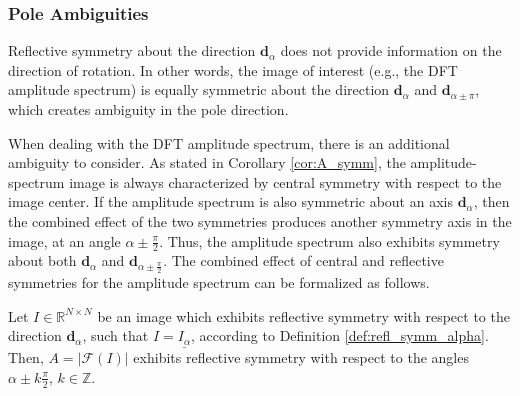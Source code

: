 \subsubsection{Pole Ambiguities}
\label{sec:pole_ambig}

Reflective symmetry about the direction $\mathbf{d}_\alpha$ does not provide information on the direction of rotation. In other words, the image of interest (e.g., the DFT amplitude spectrum) is equally symmetric about the direction $\mathbf{d}_\alpha$ and $\mathbf{d}_{\alpha \pm \pi}$, which creates ambiguity in the pole direction.

When dealing with the DFT amplitude spectrum, there is an additional ambiguity to consider. As stated in Corollary \ref{cor:A_symm}, the amplitude-spectrum image is always characterized by central symmetry with respect to the image center. If the amplitude spectrum is also symmetric about an axis $\mathbf{d}_\alpha$, then the combined effect of the two symmetries produces another symmetry axis in the image, at an angle $\alpha \pm \frac{\pi}{2}$. Thus, the amplitude spectrum also exhibits symmetry about both $\mathbf{d}_\alpha$ and $\mathbf{d}_{\alpha \pm \frac{\pi}{2}}$. The combined effect of central and reflective symmetries for the amplitude spectrum can be formalized as follows.







\begin{theorem}
    \label{th:double_symm}
    Let $I\in \mathbb{R}^{N\times N}$ be an image which exhibits reflective symmetry with respect to the direction $\mathbf{d}_\alpha$, such that $I = \underline{I_\alpha}$, according to Definition \ref{def:refl_symm_alpha}. Then, $A=|\mathcal{F}(I)|$ exhibits reflective symmetry with respect to the angles $\alpha \pm k \frac{\pi}{2},\, k \in \mathbb{Z}$.
\end{theorem}

